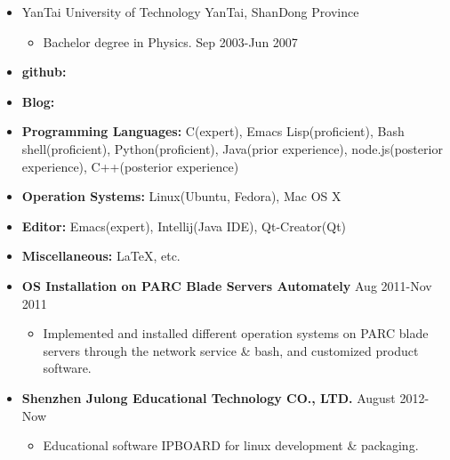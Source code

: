 \documentclass[a4paper, 10pt, titlepage]{article}
\begin{document}
\begin{itemize}

\item YanTai University of Technology \hfill \textrm{YanTai, ShanDong Province}
  \begin{itemize}
  \item Bachelor degree in Physics.  \hfill \textrm{Sep 2003-Jun 2007}
  \end{itemize}

\end{itemize}

\begin{itemize}
\item \textbf{github:}{\small \href{https://github.com/suzp1984}{\color{blue}{https://github.com/suzp1984}}}
\item \textbf{Blog:}{\small \href{http://zpcat.blogspot.com/}{\color{blue}{http://zpcat.blogspot.com/}}}
\item \textbf{Programming Languages:} C(expert), Emacs Lisp(proficient), Bash shell(proficient), Python(proficient), Java(prior experience), node.js(posterior experience), C++(posterior experience)
\item \textbf{Operation Systems:} Linux(Ubuntu, Fedora), Mac OS X
\item \textbf{Editor:} Emacs(expert), Intellij(Java IDE), Qt-Creator(Qt)
\item \textbf{Miscellaneous:} {\LaTeX}, etc.
\end{itemize}

\begin{itemize}

\item \textbf{OS Installation on PARC Blade Servers Automately} \hfill \textrm{Aug 2011-Nov 2011}
  \begin{itemize}
  \item Implemented and installed different operation systems on PARC blade servers through the network service \& bash, and customized product software.
  \end{itemize}


\end{itemize}


\begin{itemize}

\item \textbf{Shenzhen Julong Educational Technology CO., LTD.} \hfill \textrm{August 2012-Now}
  \begin{itemize}
    \item Educational software IPBOARD for linux development \& packaging.
  \end{itemize}

\end{itemize}
\end{document}

